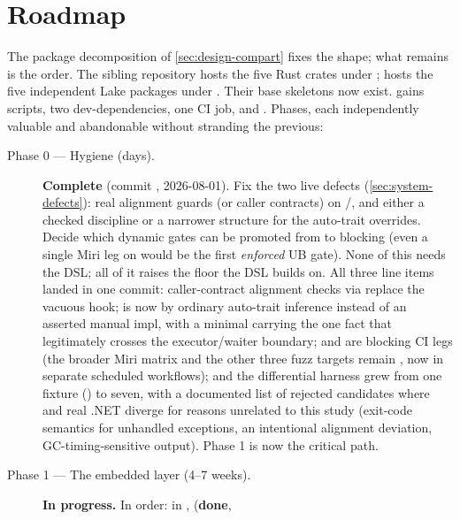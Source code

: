 \section{Roadmap}
\label{sec:roadmap}

The package decomposition of \cref{sec:design-compart} fixes the shape;
what remains is the order. The sibling  repository
hosts the five Rust crates under ;
 hosts the five independent Lake packages under
.  Their base skeletons now exist. \dotnetrs{} gains
scripts, two dev-dependencies, one CI job, and .
Phases, each independently
valuable and abandonable without stranding the previous:

\begin{description}
\item[Phase 0 --- Hygiene (days).] \textbf{Complete} (commit
  , 2026-08-01). Fix the two live defects
  (\cref{sec:system-defects}): real alignment guards (or caller
  contracts) on /,
  and either a checked discipline or a narrower structure for the
   auto-trait overrides. Decide which dynamic
  gates can be promoted from  to blocking (even
  a single Miri leg on  would be the first
  \emph{enforced} UB gate). None of this needs the DSL; all of it
  raises the floor the DSL builds on. All three line items landed in
  one commit: caller-contract alignment checks via 
  replace the vacuous hook;  is now 
  by ordinary auto-trait inference instead of an asserted manual impl,
  with a minimal  carrying the one fact that
  legitimately crosses the executor/waiter boundary; 
  and  are blocking CI legs (the broader
  Miri matrix and the other three fuzz targets remain
  , now in separate scheduled workflows); and
  the differential harness grew from one fixture
  () to seven, with a documented list of
  rejected candidates where \dotnetrs{} and real .NET diverge for
  reasons unrelated to this study (exit-code semantics for unhandled
  exceptions, an intentional alignment deviation, GC-timing-sensitive
  output). Phase 1 is now the critical path.
\item[Phase 1 --- The embedded layer (4--7 weeks).] \textbf{In
  progress.} In order:
  in ,  (\textbf{done},

\end{description}
